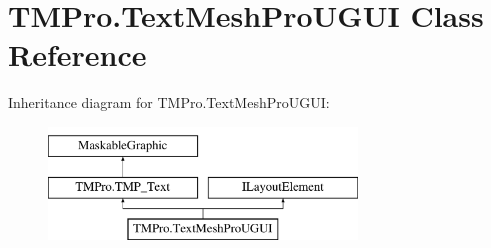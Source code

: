 \hypertarget{class_t_m_pro_1_1_text_mesh_pro_u_g_u_i}{}\section{T\+M\+Pro.\+Text\+Mesh\+Pro\+U\+G\+UI Class Reference}
\label{class_t_m_pro_1_1_text_mesh_pro_u_g_u_i}
Inheritance diagram for T\+M\+Pro.\+Text\+Mesh\+Pro\+U\+G\+UI\+:\begin{figure}[H]
\begin{center}
\leavevmode
\includegraphics[height=3.000000cm]{class_t_m_pro_1_1_text_mesh_pro_u_g_u_i}
\end{center}
\end{figure}

